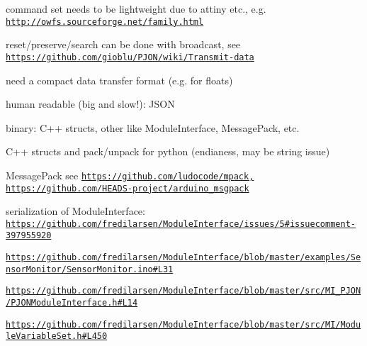 \begin{DoxyItemize}
\item command set needs to be lightweight due to attiny etc., e.\-g. \href{http://owfs.sourceforge.net/family.html}{\tt http\-://owfs.\-sourceforge.\-net/family.\-html}
\begin{DoxyItemize}
\item reset/preserve/search can be done with broadcast, see \href{https://github.com/gioblu/PJON/wiki/Transmit-data}{\tt https\-://github.\-com/gioblu/\-P\-J\-O\-N/wiki/\-Transmit-\/data}
\item need a compact data transfer format (e.\-g. for floats)
\begin{DoxyItemize}
\item human readable (big and slow!)\-: J\-S\-O\-N
\item binary\-: C++ structs, other like Module\-Interface, Message\-Pack, etc.
\begin{DoxyItemize}
\item C++ structs and pack/unpack for python (endianess, may be string issue)
\item Message\-Pack see \href{https://github.com/ludocode/mpack,}{\tt https\-://github.\-com/ludocode/mpack,} \href{https://github.com/HEADS-project/arduino_msgpack}{\tt https\-://github.\-com/\-H\-E\-A\-D\-S-\/project/arduino\-\_\-msgpack}
\item serialization of Module\-Interface\-: \href{https://github.com/fredilarsen/ModuleInterface/issues/5#issuecomment-397955920}{\tt https\-://github.\-com/fredilarsen/\-Module\-Interface/issues/5\#issuecomment-\/397955920}
\begin{DoxyItemize}
\item \href{https://github.com/fredilarsen/ModuleInterface/blob/master/examples/SensorMonitor/SensorMonitor.ino#L31}{\tt https\-://github.\-com/fredilarsen/\-Module\-Interface/blob/master/examples/\-Sensor\-Monitor/\-Sensor\-Monitor.\-ino\#\-L31}
\item \href{https://github.com/fredilarsen/ModuleInterface/blob/master/src/MI_PJON/PJONModuleInterface.h#L14}{\tt https\-://github.\-com/fredilarsen/\-Module\-Interface/blob/master/src/\-M\-I\-\_\-\-P\-J\-O\-N/\-P\-J\-O\-N\-Module\-Interface.\-h\#\-L14}
\item \href{https://github.com/fredilarsen/ModuleInterface/blob/master/src/MI/ModuleVariableSet.h#L450}{\tt https\-://github.\-com/fredilarsen/\-Module\-Interface/blob/master/src/\-M\-I/\-Module\-Variable\-Set.\-h\#\-L450}
\end{DoxyItemize}
\end{DoxyItemize}

\end{DoxyItemize}
\end{DoxyItemize}
\end{DoxyItemize}
